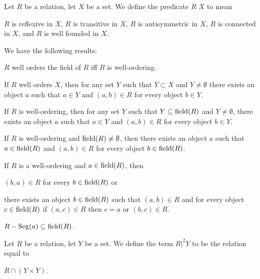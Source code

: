 \documentclass{article}
\begin{document}
\begin{definition}
Let $R$ be a relation, let $X$ be a set. We define the predicate $R$
 $X$ to mean
\begin{defn}
\item $R$ is reflexive in $X$,
  $R$ is transitive in $X$,
  $R$ is antisymmetric in $X$,
  $R$ is connected in $X$, and
  $R$ is well founded in $X$.
\end{defn}
\end{definition}

We have the following results:
\begin{thm}
\item\label{wellord1:4} $R$ well orders the field of $R$ iff $R$ is well-ordering.
\item\label{wellord1:5} If $R$ well orders $X$,
  then for any set $Y$ such that $Y\subset X$ and $Y\neq\emptyset$
  there exists an object $a$ such that $a\in Y$ and $(a,b)\in R$ for every object $b\in Y$.
\item\label{wellord1:6} If $R$ is well-ordering,
  then for any set $Y$ such that $Y\subseteq\operatorname{field}(R)$ and $Y\neq\emptyset$,
  there exists an object $a$ such that $a\in Y$ and $(a,b)\in R$ for every object $b\in Y$.
\item\label{wellord1:7} If $R$ is well-ordering and $\operatorname{field}(R)\neq\emptyset$,
  then there exists an object $a$ such that $a\in\operatorname{field}(R)$ and
  $(a,b)\in R$ for every object $b\in\operatorname{field}(R)$.
\item\label{wellord1:8} If $R$ is a well-ordering and $a\in\operatorname{field}(R)$,
  then \begin{enumerate*}[label=(\roman*)]
  \item $(b,a)\in R$ for every $b\in\operatorname{field}(R)$ or
  \item there exists an object $b\in\operatorname{field}(R)$ such that $(a,b)\in R$
    and for every object $c\in\operatorname{field}(R)$ if $(a,c)\in R$ then $c=a$ or
    $(b,c)\in R$.
  \end{enumerate*}
\item\label{wellord1:9} $R-\operatorname{Seg}(a)\subseteq\operatorname{field}(R)$.
\end{thm}

\begin{definition}
Let $R$ be a relation, let $Y$ be a set.
We define the term $R|^{2}Y$ to be the relation equal to
\begin{defn}
\item $R\cap(Y\times Y)$.
\end{defn}
\end{definition}
\end{document}
